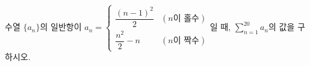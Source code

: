 수열 $\{a_n\}$의 일반항이 $a_n=\begin{cases} \dfrac{(n-1)^2}{2} & (n\text{이 홀수}) \\[1mm] \dfrac{n^2}{2}-n & (n\text{이 짝수}) \end{cases}$일 때, $\displaystyle\sum_{n=1}^{20}a_n$의 값을 구하시오.
